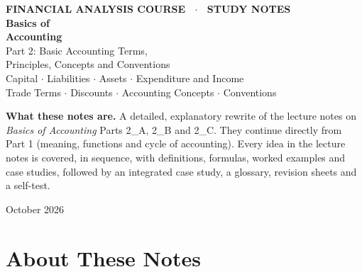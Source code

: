 \documentclass[11pt,a4paper]{article}
\begin{document}
\begin{titlepage}
\thispagestyle{empty}
\vspace*{1.6cm}
{\color{white}\sffamily
{\large\bfseries FINANCIAL ANALYSIS COURSE \ $\cdot$ \ STUDY NOTES}\\[1.3cm]
{\fontsize{36}{42}\selectfont\bfseries Basics of\\[2pt]Accounting}\\[0.6cm]
{\fontsize{19}{23}\selectfont Part 2: Basic Accounting Terms,\\[2pt] Principles, Concepts and Conventions}\\[0.7cm]
{\large Capital $\cdot$ Liabilities $\cdot$ Assets $\cdot$ Expenditure and Income\\
Trade Terms $\cdot$ Discounts $\cdot$ Accounting Concepts $\cdot$ Conventions}}
\vfill
{\sffamily
\begin{tcolorbox}[enhanced,colback=white,colframe=acnavy!40,boxrule=0.5pt,arc=3pt]
\textbf{What these notes are.} A detailed, explanatory rewrite of the lecture notes on
\emph{Basics of Accounting} Parts 2\_A, 2\_B and 2\_C. They continue directly from Part 1
(meaning, functions and cycle of accounting). Every idea in the lecture notes is covered, in
sequence, with definitions, formulas, worked examples and case studies, followed by an
integrated case study, a glossary, revision sheets and a self-test.
\end{tcolorbox}}
\vspace{0.6cm}
\begin{center}\sffamily\color{gray} October 2026\end{center}
\end{titlepage}

\section*{About These Notes}
\end{document}
